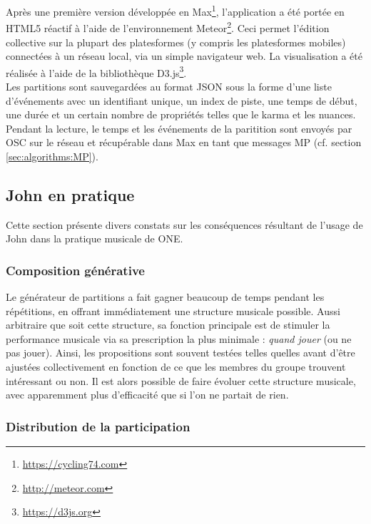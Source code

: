 \noindent Après une première version développée en Max\footnote{\url{https://cycling74.com}}, l'application a été portée en \gls{HTML5} réactif à l'aide de l'environnement Meteor\footnote{\url{http://meteor.com}}. Ceci permet l'édition collective sur la plupart des platesformes (y compris les platesformes mobiles) connectées à un réseau local, via un simple navigateur web. La visualisation a été réalisée à l'aide de la bibliothèque D3.js\footnote{\url{https://d3js.org}}.\\
\indent Les partitions sont sauvegardées au format \gls{JSON} sous la forme d'une liste d'événements avec un identifiant unique, un index de piste, une temps de début, une durée et un certain nombre de propriétés telles que le karma et les nuances. Pendant la lecture, le temps et les événements de la paritition sont envoyés par \gls{OSC} sur le réseau et récupérable dans Max en tant que messages MP (cf. section \ref{sec:algorithms:MP}).

\subsection{John en pratique}
\noindent Cette section présente divers constats sur les conséquences résultant de l'usage de John dans la pratique musicale de ONE.

\subsubsection{Composition générative}

\noindent Le générateur de partitions a fait gagner beaucoup de temps pendant les répétitions, en offrant immédiatement une structure musicale possible. Aussi arbitraire que soit cette structure, sa fonction principale est de stimuler la performance musicale via sa prescription la plus minimale : \textit{quand jouer} (ou ne pas jouer). Ainsi, les propositions sont souvent testées telles quelles avant d'être ajustées collectivement en fonction de ce que les membres du groupe trouvent intéressant ou non. Il est alors possible de faire évoluer cette structure musicale, avec apparemment plus d'efficacité que si l'on ne partait de rien.

\subsubsection{Distribution de la participation}

